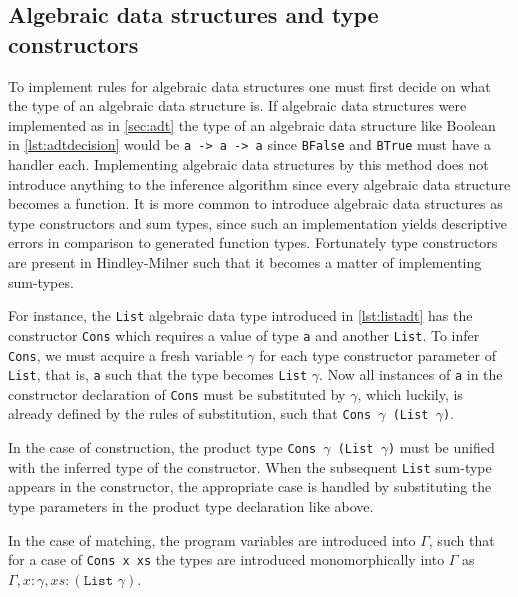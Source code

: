 \documentclass[11pt,oneside,a4paper]{report}
\begin{document}
\subsection{Algebraic data structures and type constructors}
To implement rules for algebraic data structures one must first decide on what the type of an algebraic data structure is.
If algebraic data structures were implemented as in \autoref{sec:adt} the type of an algebraic data structure like Boolean in \autoref{lst:adtdecision} would be \texttt{a -> a -> a} since \texttt{BFalse} and \texttt{BTrue} must have a handler each.
Implementing algebraic data structures by this method does not introduce anything to the inference algorithm since every algebraic data structure becomes a function.
It is more common to introduce algebraic data structures as type constructors and sum types, since such an implementation yields descriptive errors in comparison to generated function types.
Fortunately type constructors are present in Hindley-Milner such that it becomes a matter of implementing sum-types.

For instance, the \texttt{List} algebraic data type introduced in \autoref{lst:listadt} has the constructor \texttt{Cons} which requires a value of type \texttt{a} and another \texttt{List}.
To infer \texttt{Cons}, we must acquire a fresh variable $\gamma$ for each type constructor parameter of \texttt{List}, that is, \texttt{a} such that the type becomes \texttt{List} $\gamma$.
Now all instances of \texttt{a} in the constructor declaration of \texttt{Cons} must be substituted by $\gamma$, which luckily, is already defined by the rules of substitution, such that \texttt{Cons $\gamma$ (List $\gamma$)}.

In the case of construction, the product type \texttt{Cons $\gamma$ (List $\gamma$)} must be unified with the inferred type of the constructor.
When the subsequent \texttt{List} sum-type appears in the constructor, the appropriate case is handled by substituting the type parameters in the product type declaration like above.

In the case of matching, the program variables are introduced into $\Gamma$, such that for a case of \texttt{Cons x xs} the types are introduced monomorphically into $\Gamma$ as $\Gamma,x:\gamma,xs:(\texttt{List } \gamma)$.

\end{document}
